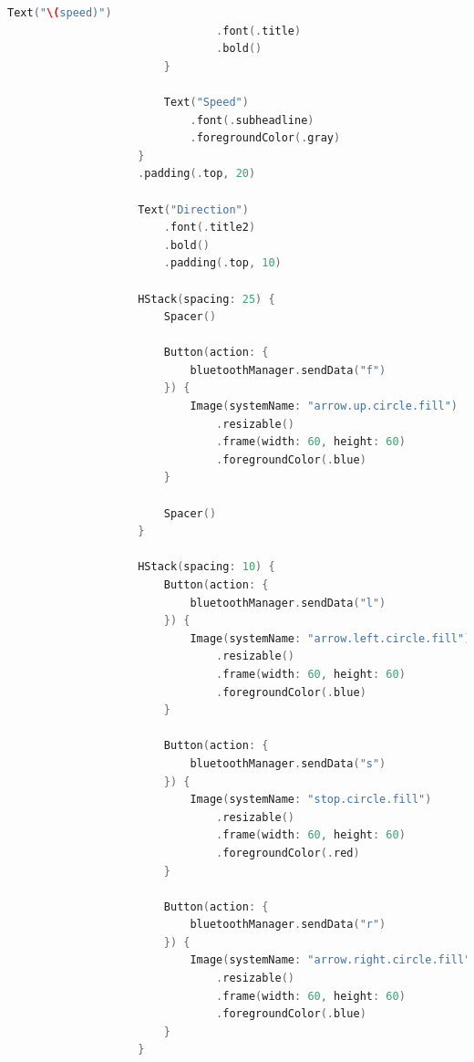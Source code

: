 \begin{lstlisting}[language=c++]
                            Text("\(speed)")
                                .font(.title)
                                .bold()
                        }

                        Text("Speed")
                            .font(.subheadline)
                            .foregroundColor(.gray)
                    }
                    .padding(.top, 20)
                    
                    Text("Direction")
                        .font(.title2)
                        .bold()
                        .padding(.top, 10)

                    HStack(spacing: 25) {
                        Spacer()

                        Button(action: {
                            bluetoothManager.sendData("f")
                        }) {
                            Image(systemName: "arrow.up.circle.fill")
                                .resizable()
                                .frame(width: 60, height: 60)
                                .foregroundColor(.blue)
                        }

                        Spacer()
                    }

                    HStack(spacing: 10) {
                        Button(action: {
                            bluetoothManager.sendData("l")
                        }) {
                            Image(systemName: "arrow.left.circle.fill")
                                .resizable()
                                .frame(width: 60, height: 60)
                                .foregroundColor(.blue)
                        }

                        Button(action: {
                            bluetoothManager.sendData("s")
                        }) {
                            Image(systemName: "stop.circle.fill")
                                .resizable()
                                .frame(width: 60, height: 60)
                                .foregroundColor(.red)
                        }

                        Button(action: {
                            bluetoothManager.sendData("r")
                        }) {
                            Image(systemName: "arrow.right.circle.fill")
                                .resizable()
                                .frame(width: 60, height: 60)
                                .foregroundColor(.blue)
                        }
                    }


\end{lstlisting}
